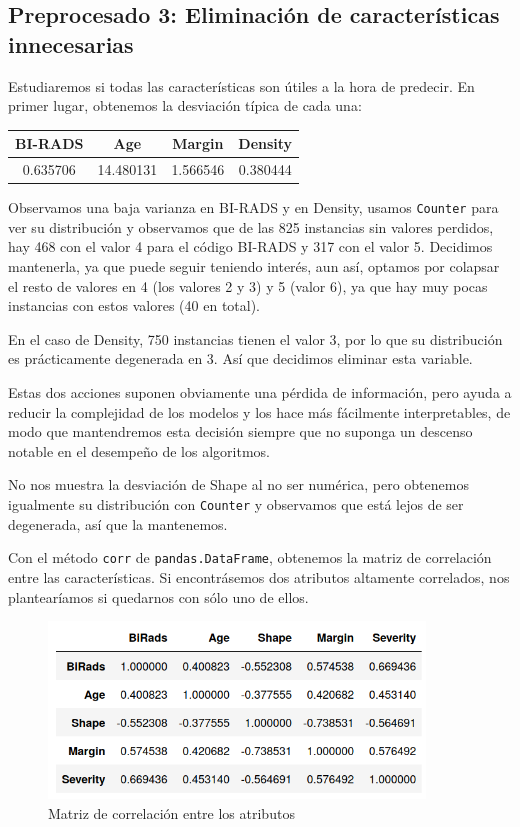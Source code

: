\documentclass{article}
\begin{document}
\subsection{Preprocesado 3: Eliminación de características innecesarias}

Estudiaremos si todas las características son útiles a la hora de
predecir. En primer lugar, obtenemos la desviación típica de cada una:

\begin{table}[H]
  \centering
  \begin{tabular}{cccc}
    BI-RADS &  Age & Margin & Density \\ \hline
	0.635706 & 14.480131 & 1.566546 & 0.380444
  \end{tabular}
\end{table}
Observamos una baja varianza en BI-RADS y en Density, usamos
\texttt{Counter} para ver su distribución y observamos que de las 825
instancias sin valores perdidos, hay 468 con el valor 4 para el código
BI-RADS y 317 con el valor 5. Decidimos mantenerla, ya que puede
seguir teniendo interés, aun así, optamos por colapsar el resto de
valores en 4 (los valores 2 y 3) y 5 (valor 6), ya que hay muy pocas
instancias con estos valores (40 en total). 

En el caso de Density, 750 instancias tienen el valor 3, por lo que su
distribución es prácticamente degenerada en 3. Así que decidimos
eliminar esta variable.

Estas dos acciones suponen obviamente una pérdida de información, pero
ayuda a reducir la complejidad de los modelos y los hace más
fácilmente interpretables, de modo que mantendremos esta decisión
siempre que no suponga un descenso notable en el desempeño de los
algoritmos.

No nos muestra la desviación de Shape al no ser numérica, pero
obtenemos igualmente su distribución con \texttt{Counter} y observamos
que está lejos de ser degenerada, así que la mantenemos.

Con el método \texttt{corr} de \texttt{pandas.DataFrame}, obtenemos la
matriz de correlación entre las características. Si encontrásemos dos
atributos altamente correlados, nos plantearíamos si quedarnos con
sólo uno de ellos.

\begin{figure}[H]
  \centering
  \includegraphics[width=100mm]{figures/corr}
  \caption{Matriz de correlación entre los atributos}
  \label{fig:corr}
\end{figure}
\end{document}
